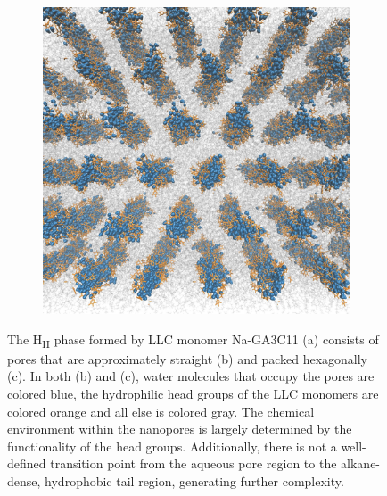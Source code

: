 \documentclass[journal=jpcbfk,manuscript=article]{achemso}
\begin{document}
\begin{figure}
\begin{subfigure}{0.325\textwidth}
  \includegraphics[width=\textwidth]{top_view.pdf}
  \caption{}
  \end{subfigure}
  \caption{The H\textsubscript{II} phase formed by LLC monomer Na-GA3C11 (a)
  consists of pores that are approximately straight (b) and packed hexagonally (c).
  In both (b) and (c), water molecules that occupy the pores are colored blue, 
  the hydrophilic head groups of the LLC monomers are colored orange and all else is colored gray. 
  The chemical environment within the nanopores is largely determined by the functionality
  of the head groups. Additionally, there is not a well-defined transition
  point from the aqueous pore region to the alkane-dense, hydrophobic tail region,
  generating further complexity.
  }\label{fig:membrane_rendering}
  \end{figure}
\end{document}

